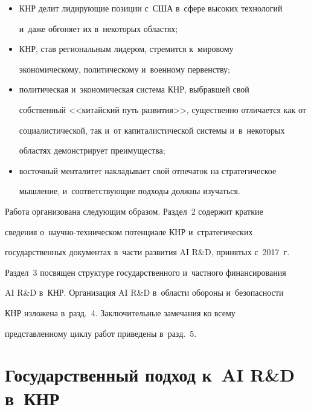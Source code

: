      \begin{itemize}


\item КНР делит лидирующие позиции с~США в~сфере высоких технологий 


и~даже обгоняет их в~некоторых областях;


\item КНР, став региональным лидером, стремится к~мировому 


экономическому, политическому и~военному первенству;


\item политическая и~экономическая система КНР, выбравшей свой 


собственный <<китайский путь развития>>, существенно отличается как от 


социалистической, так и~от капиталистической сис\-те\-мы и~в~некоторых 


областях демонстрирует преимущества;


\item восточный менталитет накладывает свой отпечаток на стратегическое 


мыш\-ле\-ние, и~соответствующие подходы должны изучаться.


\end{itemize}





     Работа организована следующим образом. Раздел~2 содержит краткие 


сведения о~на\-уч\-но-тех\-ни\-че\-ском потенциале КНР и~стратегических 


государственных документах в~части развития AI R\&D, принятых с~2017~г. 


Раздел~3 посвящен структуре государственного и~частного финансирования 


AI R\&D в~КНР. Организация AI R\&D в~об\-ласти обороны и~безопас\-ности 


КНР изложена в~разд.~4. Заключительные замечания ко всему 


представленному циклу работ приведены в~разд.~5.


     





\section{Государственный подход к~AI R\&D в~КНР}


